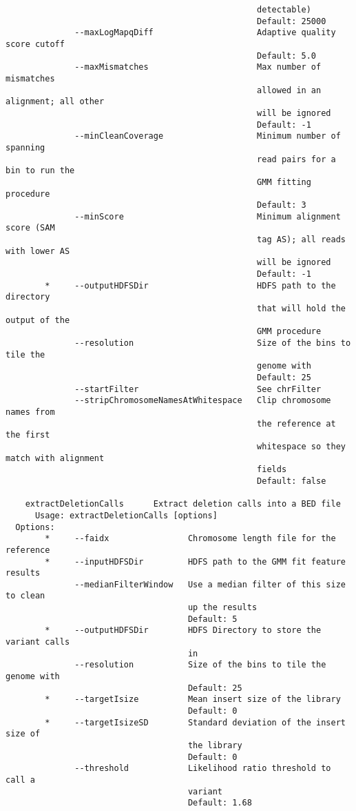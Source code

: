 \documentclass[11pt]{article}
\begin{document}
\begin{verbatim}
                                                   detectable)
                                                   Default: 25000
              --maxLogMapqDiff                     Adaptive quality score cutoff
                                                   Default: 5.0
              --maxMismatches                      Max number of mismatches
                                                   allowed in an alignment; all other
                                                   will be ignored
                                                   Default: -1
              --minCleanCoverage                   Minimum number of spanning
                                                   read pairs for a bin to run the
                                                   GMM fitting procedure
                                                   Default: 3
              --minScore                           Minimum alignment score (SAM
                                                   tag AS); all reads with lower AS
                                                   will be ignored
                                                   Default: -1
        *     --outputHDFSDir                      HDFS path to the directory
                                                   that will hold the output of the
                                                   GMM procedure
              --resolution                         Size of the bins to tile the
                                                   genome with
                                                   Default: 25
              --startFilter                        See chrFilter
              --stripChromosomeNamesAtWhitespace   Clip chromosome names from
                                                   the reference at the first
                                                   whitespace so they match with alignment
                                                   fields
                                                   Default: false

    extractDeletionCalls      Extract deletion calls into a BED file
      Usage: extractDeletionCalls [options]
  Options:
        *     --faidx                Chromosome length file for the reference
        *     --inputHDFSDir         HDFS path to the GMM fit feature results
              --medianFilterWindow   Use a median filter of this size to clean
                                     up the results
                                     Default: 5
        *     --outputHDFSDir        HDFS Directory to store the variant calls
                                     in
              --resolution           Size of the bins to tile the genome with
                                     Default: 25
        *     --targetIsize          Mean insert size of the library
                                     Default: 0
        *     --targetIsizeSD        Standard deviation of the insert size of
                                     the library
                                     Default: 0
              --threshold            Likelihood ratio threshold to call a
                                     variant
                                     Default: 1.68


\end{verbatim}
\end{document}
